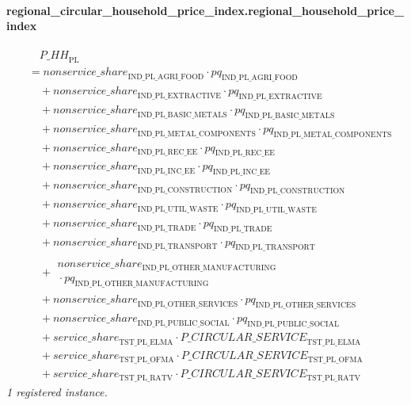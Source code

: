\documentclass[11pt]{article}
\begin{document}
\paragraph{regional\_circular\_household\_price\_index.regional\_household\_price\_index}
\begin{align*}
&\quad {P\_HH}_{\text{PL}}\\
&= {nonservice\_share}_{\text{IND\_PL\_AGRI\_FOOD}} \cdot pq_{\text{IND\_PL\_AGRI\_FOOD}}\\
&\quad {}+ {nonservice\_share}_{\text{IND\_PL\_EXTRACTIVE}} \cdot pq_{\text{IND\_PL\_EXTRACTIVE}}\\
&\quad {}+ {nonservice\_share}_{\text{IND\_PL\_BASIC\_METALS}} \cdot pq_{\text{IND\_PL\_BASIC\_METALS}}\\
&\quad {}+ {nonservice\_share}_{\text{IND\_PL\_METAL\_COMPONENTS}} \cdot pq_{\text{IND\_PL\_METAL\_COMPONENTS}}\\
&\quad {}+ {nonservice\_share}_{\text{IND\_PL\_REC\_EE}} \cdot pq_{\text{IND\_PL\_REC\_EE}}\\
&\quad {}+ {nonservice\_share}_{\text{IND\_PL\_INC\_EE}} \cdot pq_{\text{IND\_PL\_INC\_EE}}\\
&\quad {}+ {nonservice\_share}_{\text{IND\_PL\_CONSTRUCTION}} \cdot pq_{\text{IND\_PL\_CONSTRUCTION}}\\
&\quad {}+ {nonservice\_share}_{\text{IND\_PL\_UTIL\_WASTE}} \cdot pq_{\text{IND\_PL\_UTIL\_WASTE}}\\
&\quad {}+ {nonservice\_share}_{\text{IND\_PL\_TRADE}} \cdot pq_{\text{IND\_PL\_TRADE}}\\
&\quad {}+ {nonservice\_share}_{\text{IND\_PL\_TRANSPORT}} \cdot pq_{\text{IND\_PL\_TRANSPORT}}\\
&\quad {}+ \begin{aligned}
{nonservice\_share}_{\text{IND\_PL\_OTHER\_MANUFACTURING}}\\
{}\cdot pq_{\text{IND\_PL\_OTHER\_MANUFACTURING}}
\end{aligned}\\
&\quad {}+ {nonservice\_share}_{\text{IND\_PL\_OTHER\_SERVICES}} \cdot pq_{\text{IND\_PL\_OTHER\_SERVICES}}\\
&\quad {}+ {nonservice\_share}_{\text{IND\_PL\_PUBLIC\_SOCIAL}} \cdot pq_{\text{IND\_PL\_PUBLIC\_SOCIAL}}\\
&\quad {}+ {service\_share}_{\text{TST\_PL\_ELMA}} \cdot {P\_CIRCULAR\_SERVICE}_{\text{TST\_PL\_ELMA}}\\
&\quad {}+ {service\_share}_{\text{TST\_PL\_OFMA}} \cdot {P\_CIRCULAR\_SERVICE}_{\text{TST\_PL\_OFMA}}\\
&\quad {}+ {service\_share}_{\text{TST\_PL\_RATV}} \cdot {P\_CIRCULAR\_SERVICE}_{\text{TST\_PL\_RATV}}
\end{align*}
\noindent\emph{1 registered instance.}\par
\end{document}
